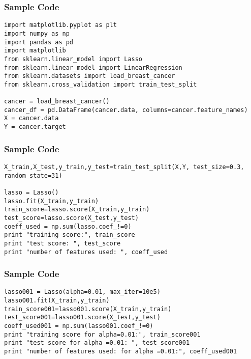 \begin{frame}[fragile]\frametitle{Sample Code}

\begin{lstlisting}
import matplotlib.pyplot as plt
import numpy as np 
import pandas as pd
import matplotlib
from sklearn.linear_model import Lasso
from sklearn.linear_model import LinearRegression
from sklearn.datasets import load_breast_cancer
from sklearn.cross_validation import train_test_split

cancer = load_breast_cancer()
cancer_df = pd.DataFrame(cancer.data, columns=cancer.feature_names)
X = cancer.data
Y = cancer.target
\end{lstlisting}
\end{frame}

\begin{frame}[fragile]\frametitle{Sample Code}

\begin{lstlisting}
X_train,X_test,y_train,y_test=train_test_split(X,Y, test_size=0.3, random_state=31)

lasso = Lasso()
lasso.fit(X_train,y_train)
train_score=lasso.score(X_train,y_train)
test_score=lasso.score(X_test,y_test)
coeff_used = np.sum(lasso.coef_!=0)
print "training score:", train_score 
print "test score: ", test_score
print "number of features used: ", coeff_used
\end{lstlisting}


\end{frame}



\begin{frame}[fragile]\frametitle{Sample Code}

\begin{lstlisting}
lasso001 = Lasso(alpha=0.01, max_iter=10e5)
lasso001.fit(X_train,y_train)
train_score001=lasso001.score(X_train,y_train)
test_score001=lasso001.score(X_test,y_test)
coeff_used001 = np.sum(lasso001.coef_!=0)
print "training score for alpha=0.01:", train_score001 
print "test score for alpha =0.01: ", test_score001
print "number of features used: for alpha =0.01:", coeff_used001
\end{lstlisting}

\end{frame}


